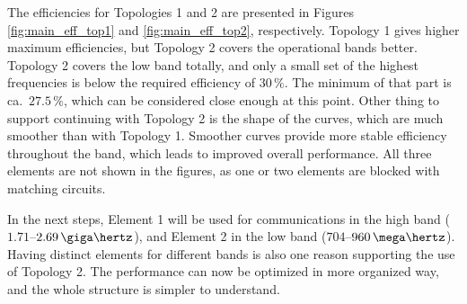 \vspace{-20pt}
The efficiencies for Topologies 1 and 2 are presented in Figures \ref{fig:main_eff_top1} and \ref{fig:main_eff_top2}, respectively. Topology 1 gives higher maximum efficiencies, but Topology 2 covers the operational bands better. Topology 2 covers the low band totally, and only a small set of the highest frequencies is below the required efficiency of $30\,\%$. The minimum of that part is ca.\ $27.5\,\%$, which can be considered close enough at this point. Other thing to support continuing with Topology 2 is the shape of the curves, which are much smoother than with Topology 1. Smoother curves provide more stable efficiency throughout the band, which leads to improved overall performance. All three elements are not shown in the figures, as one or two elements are blocked with matching circuits.

In the next steps, Element 1 will be used for communications in the high band ($1.71$--$2.69\,\giga\hertz$), and Element 2 in the low band ($704$--$960\,\mega\hertz$). Having distinct elements for different bands is also one reason supporting the use of Topology 2. The performance can now be optimized in more organized way, and the whole structure is simpler to understand.

